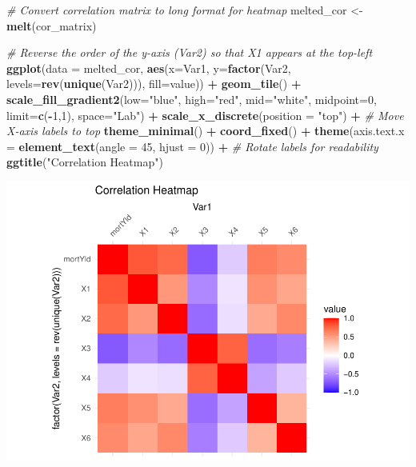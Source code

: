 \documentclass[
  12pt,
]{article}
\newenvironment{Shaded}{\begin{snugshade}}{\end{snugshade}}
\newcommand{\AttributeTok}[1]{\textcolor[rgb]{0.13,0.29,0.53}{#1}}
\newcommand{\CommentTok}[1]{\textcolor[rgb]{0.56,0.35,0.01}{\textit{#1}}}
\newcommand{\DecValTok}[1]{\textcolor[rgb]{0.00,0.00,0.81}{#1}}
\newcommand{\FunctionTok}[1]{\textcolor[rgb]{0.13,0.29,0.53}{\textbf{#1}}}
\newcommand{\NormalTok}[1]{#1}
\newcommand{\OtherTok}[1]{\textcolor[rgb]{0.56,0.35,0.01}{#1}}
\newcommand{\SpecialCharTok}[1]{\textcolor[rgb]{0.81,0.36,0.00}{\textbf{#1}}}
\newcommand{\StringTok}[1]{\textcolor[rgb]{0.31,0.60,0.02}{#1}}
\begin{document}
\begin{Shaded}
\begin{Highlighting}[]
\CommentTok{\# Convert correlation matrix to long format for heatmap}
\NormalTok{melted\_cor }\OtherTok{\textless{}{-}} \FunctionTok{melt}\NormalTok{(cor\_matrix)}

\CommentTok{\# Reverse the order of the y{-}axis (Var2) so that X1 appears at the top{-}left}
\FunctionTok{ggplot}\NormalTok{(}\AttributeTok{data =}\NormalTok{ melted\_cor, }\FunctionTok{aes}\NormalTok{(}\AttributeTok{x=}\NormalTok{Var1, }\AttributeTok{y=}\FunctionTok{factor}\NormalTok{(Var2, }\AttributeTok{levels=}\FunctionTok{rev}\NormalTok{(}\FunctionTok{unique}\NormalTok{(Var2))), }\AttributeTok{fill=}\NormalTok{value)) }\SpecialCharTok{+} 
  \FunctionTok{geom\_tile}\NormalTok{() }\SpecialCharTok{+}
  \FunctionTok{scale\_fill\_gradient2}\NormalTok{(}\AttributeTok{low=}\StringTok{"blue"}\NormalTok{, }\AttributeTok{high=}\StringTok{"red"}\NormalTok{, }\AttributeTok{mid=}\StringTok{"white"}\NormalTok{, }
                       \AttributeTok{midpoint=}\DecValTok{0}\NormalTok{, }\AttributeTok{limit=}\FunctionTok{c}\NormalTok{(}\SpecialCharTok{{-}}\DecValTok{1}\NormalTok{,}\DecValTok{1}\NormalTok{), }\AttributeTok{space=}\StringTok{"Lab"}\NormalTok{) }\SpecialCharTok{+}
  \FunctionTok{scale\_x\_discrete}\NormalTok{(}\AttributeTok{position =} \StringTok{"top"}\NormalTok{) }\SpecialCharTok{+}  \CommentTok{\# Move X{-}axis labels to top}
  \FunctionTok{theme\_minimal}\NormalTok{() }\SpecialCharTok{+}
  \FunctionTok{coord\_fixed}\NormalTok{() }\SpecialCharTok{+}
  \FunctionTok{theme}\NormalTok{(}\AttributeTok{axis.text.x =} \FunctionTok{element\_text}\NormalTok{(}\AttributeTok{angle =} \DecValTok{45}\NormalTok{, }\AttributeTok{hjust =} \DecValTok{0}\NormalTok{)) }\SpecialCharTok{+} \CommentTok{\# Rotate labels for readability}
  \FunctionTok{ggtitle}\NormalTok{(}\StringTok{"Correlation Heatmap"}\NormalTok{)}
\end{Highlighting}
\end{Shaded}

\includegraphics{report1_r1_files/figure-latex/unnamed-chunk-9-1.pdf}
\end{document}
